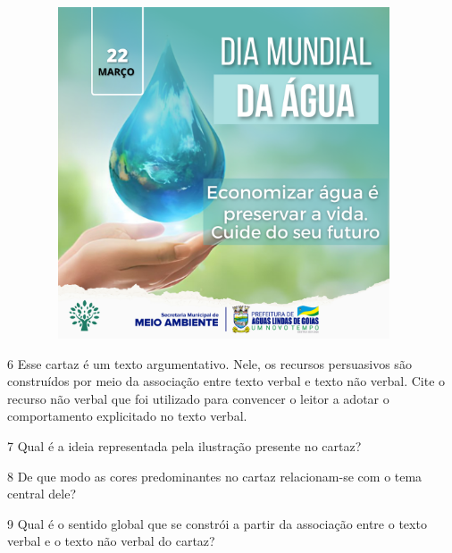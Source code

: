 \begin{figure}[H]
\centering
\includegraphics[width=4.21103in,height=3.86458in]{./imgSAEB_8_POR/media/image41.png}
\end{figure}

\num{6} Esse cartaz é um texto argumentativo. Nele, os recursos
persuasivos são construídos por meio da associação entre texto verbal e
texto não verbal. Cite o recurso não verbal que foi utilizado para
convencer o leitor a adotar o comportamento explicitado no texto verbal.


\num{7} Qual é a ideia representada pela ilustração presente no cartaz?


\pagebreak

\num{8} De que modo as cores predominantes no cartaz relacionam-se com o
tema central dele?


\num{9} Qual é o sentido global que se constrói a partir da associação
entre o texto verbal e o texto não verbal do cartaz?


